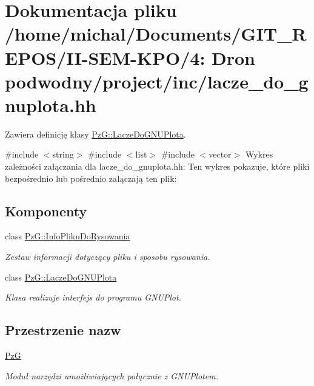 \hypertarget{lacze__do__gnuplota_8hh}{}\section{Dokumentacja pliku /home/michal/\+Documents/\+G\+I\+T\+\_\+\+R\+E\+P\+O\+S/\+I\+I-\/\+S\+E\+M-\/\+K\+P\+O/4\+: Dron podwodny/project/inc/lacze\+\_\+do\+\_\+gnuplota.hh}
\label{lacze__do__gnuplota_8hh}


Zawiera definicję klasy \hyperlink{class_pz_g_1_1_lacze_do_g_n_u_plota}{Pz\+G\+::\+Lacze\+Do\+G\+N\+U\+Plota}.  


{\ttfamily \#include $<$string$>$}\newline
{\ttfamily \#include $<$list$>$}\newline
{\ttfamily \#include $<$vector$>$}\newline
Wykres zależności załączania dla lacze\+\_\+do\+\_\+gnuplota.\+hh\+:
Ten wykres pokazuje, które pliki bezpośrednio lub pośrednio załączają ten plik\+:
\subsection*{Komponenty}
\begin{DoxyCompactItemize}
\item 
class \hyperlink{class_pz_g_1_1_info_pliku_do_rysowania}{Pz\+G\+::\+Info\+Pliku\+Do\+Rysowania}
\begin{DoxyCompactList}\small\item\em Zestaw informacji dotyczący pliku i sposobu rysowania. \end{DoxyCompactList}\item 
class \hyperlink{class_pz_g_1_1_lacze_do_g_n_u_plota}{Pz\+G\+::\+Lacze\+Do\+G\+N\+U\+Plota}
\begin{DoxyCompactList}\small\item\em Klasa realizuje interfejs do programu G\+N\+U\+Plot. \end{DoxyCompactList}\end{DoxyCompactItemize}
\subsection*{Przestrzenie nazw}
\begin{DoxyCompactItemize}
\item 
 \hyperlink{namespace_pz_g}{PzG}
\begin{DoxyCompactList}\small\item\em Moduł narzędzi umożliwiających połącznie z G\+N\+U\+Plotem. \end{DoxyCompactList}\end{DoxyCompactItemize}

